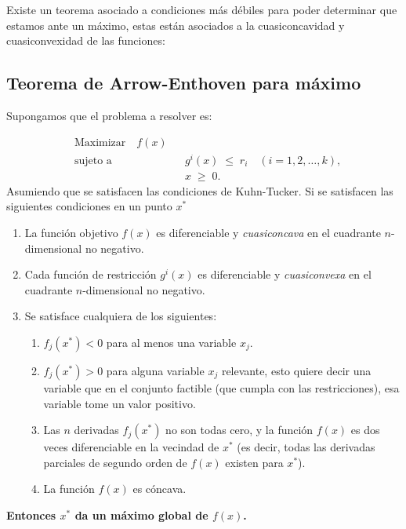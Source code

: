 \documentclass{article}
\begin{document}
Existe un teorema asociado a condiciones más débiles para poder determinar que estamos ante un máximo, estas están asociados a la cuasiconcavidad y cuasiconvexidad de las funciones:
\subsection*{Teorema de Arrow-Enthoven para máximo}
Supongamos que el problema a resolver es:

\[
\begin{aligned}
&\text{Maximizar} \quad f(x) \\
&\text{sujeto a} \quad && g^{i}(x) \;\le\; r_{i}
\quad (i = 1,2,\dots,k),\\
& && x \;\ge\; 0.
\end{aligned}
\]
Asumiendo que se satisfacen las condiciones de Kuhn-Tucker.
Si se satisfacen las siguientes condiciones en un punto $x^*$
\begin{enumerate}\color{teal}
  \item La función objetivo \(f(x)\) es diferenciable y \emph{cuasiconcava} en el cuadrante \(n\)-dimensional no negativo.
  \item Cada función de restricción \(g^{i}(x)\) es diferenciable y \emph{cuasiconvexa} en el cuadrante \(n\)-dimensional no negativo.
  \item Se satisface cualquiera de los siguientes:
    \begin{enumerate}
      \item \(f_{j}(x^{*}) < 0\) para al menos una variable \(x_{j}\).
      \item \(f_{j}(x^{*}) > 0\) para alguna variable \(x_{j}\) relevante, esto quiere decir una variable que en el conjunto factible (que cumpla con las restricciones), esa variable tome un valor positivo.
      \item Las \(n\) derivadas \(f_{j}(x^{*})\) no son todas cero, y la función \(f(x)\) es dos veces diferenciable en la vecindad de \(x^{*}\) (es decir, todas las derivadas parciales de segundo orden de \(f(x)\) existen para \(x^{*}\)).
      \item La función \(f(x)\) es cóncava.
    \end{enumerate}
\end{enumerate}

\textbf{\color{teal}Entonces \(x^{*}\) da un máximo global de \(f(x)\).
}
\end{document}
